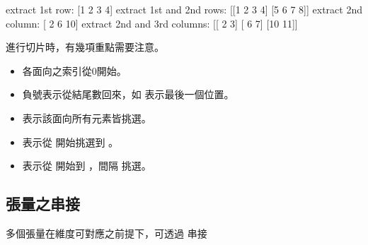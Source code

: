 \documentclass[letterpaper,10pt,english]{sphinxmanual}
\begin{document}
\begin{sphinxVerbatim}[commandchars=\\\{\}]
extract 1st row: 
 [1 2 3 4]
extract 1st and 2nd rows: 
 [[1 2 3 4]
 [5 6 7 8]]
extract 2nd column: 
 [ 2  6 10]
extract 2nd and 3rd columns: 
 [[ 2  3]
 [ 6  7]
 [10 11]]
\end{sphinxVerbatim}

進行切片時，有幾項重點需要注意。
\begin{itemize}
\item {} 
各面向之索引從0開始。

\item {} 
負號表示從結尾數回來，如  表示最後一個位置。

\item {} 
\sphinxcode{\sphinxupquote{:}}表示該面向所有元素皆挑選。

\item {} 
 表示從  開始挑選到 。

\item {} 
 表示從  開始到 ，間隔  挑選。

\end{itemize}


\subsection{張量之串接}
\label{\detokenize{notebook/lab-torch-tensor:id8}}
多個張量在維度可對應之前提下，可透過  串接

\begin{sphinxVerbatim}[commandchars=\\\{\}]
      \PYG{p}{[} \PYG{p}{]}   
      \PYG{p}{[} \PYG{p}{]}   
\end{sphinxVerbatim}
\end{document}
